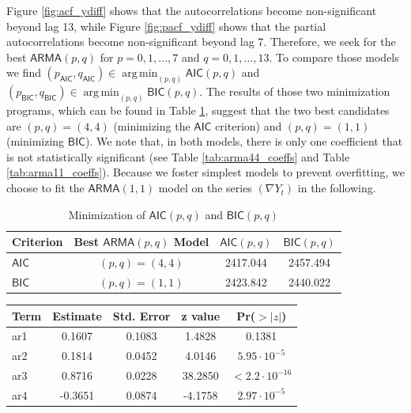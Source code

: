 \documentclass[12pt]{article}
\DeclareMathOperator*{\argmin}{arg\,min}
\newcommand{\ARMA}{\textsf{ARMA}}
\newcommand{\AIC}{\textsf{AIC}}
\newcommand{\BIC}{\textsf{BIC}}
\begin{document}
\begin{enumerate}
        Figure \ref{fig:acf_ydiff} shows that the autocorrelations become non-significant beyond lag 13, while Figure \ref{fig:pacf_ydiff} shows that the partial autocorrelations become non-significant beyond lag 7. Therefore, we seek for the best $\ARMA(p, q)$ for $p = 0, 1, \dots, 7$ and $q = 0, 1, \dots, 13$. To compare those models we find $(p_{\AIC}, q_{\AIC}) \in \argmin_{(p, q)} \AIC(p, q)$ and $(p_{\BIC}, q_{\BIC}) \in \argmin_{(p, q)} \BIC(p, q)$. The results of those two minimization programs, which can be found in Table \ref{tab:aic_bic_results}, suggest that the two best candidates are $(p, q) = (4, 4)$ (minimizing the $\AIC$ criterion) and $(p, q) = (1, 1)$ (minimizing $\BIC$). We note that, in both models, there is only one coefficient that is not statistically significant (see Table \ref{tab:arma44_coeffs} and Table \ref{tab:arma11_coeffs}). Because we foster simplest models to prevent overfitting, we choose to fit the $\ARMA(1, 1)$ model on the series $(\nabla Y_t)$ in the following.
        \begin{table}[ht]
            \centering
            \begin{tabular}{l|ccc}
                \textbf{Criterion} & \textbf{Best $\ARMA(p, q)$ Model} & \textbf{$\AIC(p, q)$} & \textbf{$\BIC(p, q)$} \\
                \hline
                $\AIC$  & $(p, q) = (4, 4)$ & 2417.044 & 2457.494 \\
                $\BIC$  & $(p, q) = (1, 1)$ & 2423.842 & 2440.022 
            \end{tabular}
            \caption{Minimization of $\AIC(p, q)$ and $\BIC(p, q)$}
            \label{tab:aic_bic_results}
        \end{table}
        \begin{table}[ht]
            \centering
            \begin{tabular}{l|cccc}
                \textbf{Term} & \textbf{Estimate} & \textbf{Std. Error} & \textbf{z value} & \textbf{Pr($>|z|$)} \\
                \hline
                \rowcolor{red!15} ar1          & 0.1607  & 0.1083 & 1.4828   & 0.1381 \\
                ar2                            & 0.1814  & 0.0452 & 4.0146   & $5.95 \cdot 10^{-5}$ \\
                ar3                            & 0.8716  & 0.0228 & 38.2850  & $< 2.2 \cdot 10^{-16}$ \\
                ar4                            & -0.3651 & 0.0874 & -4.1758  & $2.97 \cdot 10^{-5}$ \\

\end{tabular}
\end{table}
\end{enumerate}
\end{document}
